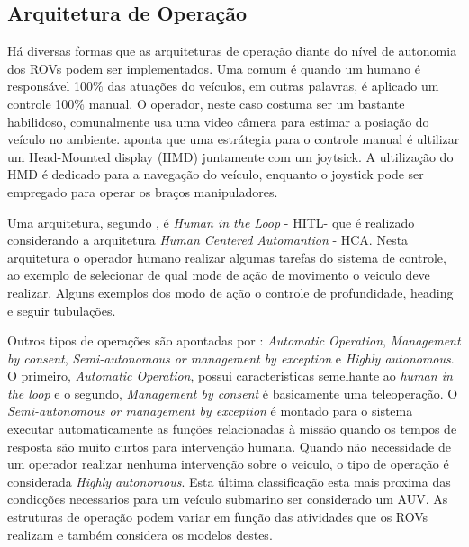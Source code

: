 \subsection{Arquitetura de Operação}
Há diversas formas que as arquiteturas de operação diante do nível de autonomia dos ROVs podem ser implementados. Uma comum é quando um humano é responsável 100\% das atuações do veículos, em outras palavras, é aplicado um controle 100\% manual. O operador, neste caso costuma ser um bastante habilidoso, comunalmente usa uma video câmera para estimar a posiação do veículo no ambiente. \cite{Towards} aponta que uma estrátegia para o controle manual é ultilizar um Head-Mounted display (HMD) juntamente com um joytsick. A ultilização do HMD é dedicado para a navegação do veículo, enquanto o joystick pode ser empregado para operar os braços manipuladores.

Uma arquitetura, segundo \cite{wireless_joy}, é \textit{Human in the Loop} - HITL- que é realizado considerando a arquitetura \textit{Human Centered Automantion} - HCA. Nesta arquitetura o operador humano realizar algumas tarefas do sistema de controle, ao exemplo de selecionar de qual mode de ação de movimento o veiculo deve realizar. Alguns exemplos dos modo de ação o controle de profundidade, heading e seguir tubulações.

Outros tipos de operações são apontadas por \cite{Towards}: \textit{Automatic Operation}, \textit{Management by consent}, \textit{Semi-autonomous or management by exception} e \textit{Highly autonomous}. O primeiro, \textit{Automatic Operation}, possui caracteristicas semelhante ao \textit{human in the loop} e o segundo, \textit{Management by consent} é basicamente uma teleoperação. O \textit{Semi-autonomous or management by exception} é montado para o sistema executar automaticamente as funções relacionadas à missão quando os tempos de resposta são muito curtos para intervenção humana.  Quando não necessidade de um operador realizar nenhuma intervenção sobre o veiculo, o tipo de operação é considerada \textit{Highly autonomous}. Esta última classificação esta mais proxima das condicções necessarios para um veículo submarino ser considerado um AUV. As estruturas de operação podem variar em função das atividades que os ROVs realizam e também considera os modelos destes. 










